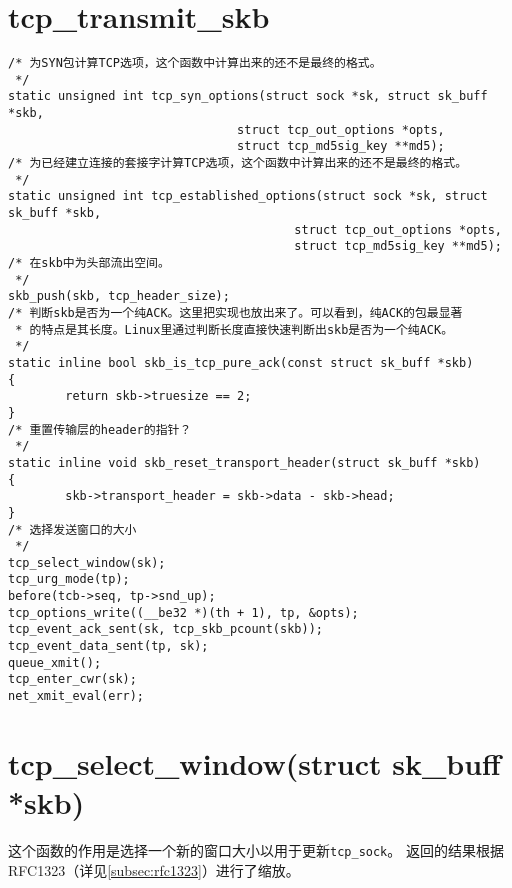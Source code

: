 \section{tcp\_transmit\_skb}

\begin{verbatim}
/* 为SYN包计算TCP选项，这个函数中计算出来的还不是最终的格式。
 */
static unsigned int tcp_syn_options(struct sock *sk, struct sk_buff *skb,
                                struct tcp_out_options *opts,
                                struct tcp_md5sig_key **md5);
/* 为已经建立连接的套接字计算TCP选项，这个函数中计算出来的还不是最终的格式。
 */
static unsigned int tcp_established_options(struct sock *sk, struct sk_buff *skb,
                                        struct tcp_out_options *opts,
                                        struct tcp_md5sig_key **md5);
/* 在skb中为头部流出空间。
 */
skb_push(skb, tcp_header_size);
/* 判断skb是否为一个纯ACK。这里把实现也放出来了。可以看到，纯ACK的包最显著
 * 的特点是其长度。Linux里通过判断长度直接快速判断出skb是否为一个纯ACK。
 */
static inline bool skb_is_tcp_pure_ack(const struct sk_buff *skb)
{
        return skb->truesize == 2;
}
/* 重置传输层的header的指针？
 */
static inline void skb_reset_transport_header(struct sk_buff *skb)
{
        skb->transport_header = skb->data - skb->head;
}
/* 选择发送窗口的大小
 */
tcp_select_window(sk);
tcp_urg_mode(tp);
before(tcb->seq, tp->snd_up);
tcp_options_write((__be32 *)(th + 1), tp, &opts);
tcp_event_ack_sent(sk, tcp_skb_pcount(skb));
tcp_event_data_sent(tp, sk);
queue_xmit();
tcp_enter_cwr(sk);
net_xmit_eval(err);
\end{verbatim}

\section{tcp\_select\_window(struct sk\_buff *skb)}
这个函数的作用是选择一个新的窗口大小以用于更新\texttt{tcp_sock}。
返回的结果根据RFC1323（详见\ref{subsec:rfc1323}）进行了缩放。

